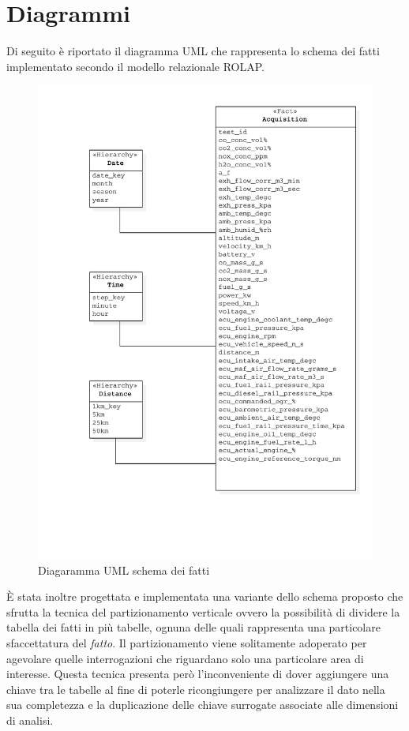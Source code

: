 \section{Diagrammi}
Di seguito è riportato il diagramma UML che rappresenta lo schema dei fatti implementato secondo il modello relazionale ROLAP.
\begin{figure}[H]
	\centering
	\includegraphics[scale=0.56]{figures/class_fact_scheme}
	\caption{Diagaramma UML schema dei fatti}
	\label{fig:ofm}
\end{figure}
È stata inoltre progettata e implementata una variante dello schema proposto che sfrutta la tecnica del partizionamento verticale ovvero la possibilità di dividere la tabella dei fatti in più tabelle, ognuna delle quali rappresenta una particolare sfaccettatura del \textit{fatto}. Il partizionamento viene solitamente adoperato per agevolare quelle interrogazioni che riguardano solo una particolare area di interesse. Questa tecnica presenta però l'inconveniente di dover aggiungere una chiave tra le tabelle al fine di poterle ricongiungere per analizzare il dato nella sua completezza e la duplicazione delle chiave surrogate associate alle dimensioni di analisi.

